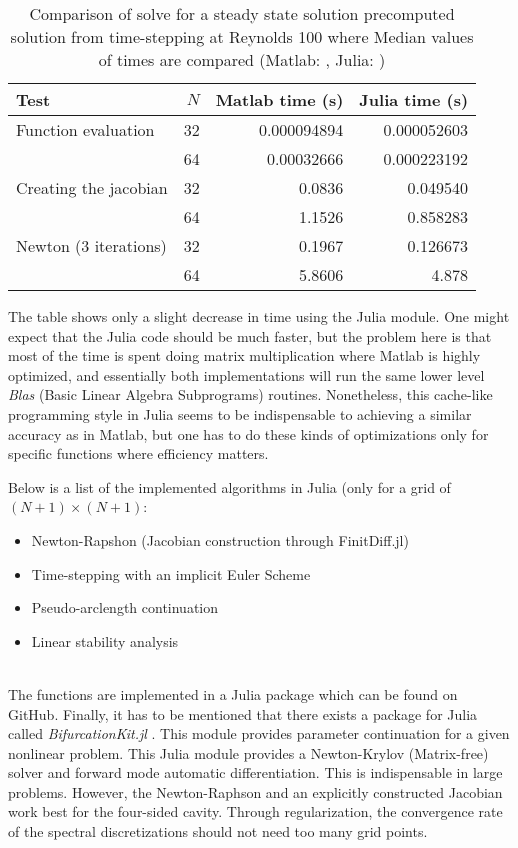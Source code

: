 \begin{table}[h!]
  \caption{Comparison of solve for a steady state solution precomputed solution 
    from time-stepping at Reynolds 100 where Median values of times are compared
  (Matlab: , Julia: )}
  \label{tab:matlab_julia}
\begin{tabular}{lrrr}
Test & $N$ & Matlab time (s) & Julia time (s) \\
\hline
Function evaluation  & 32 & 0.000094894  & 0.000052603 \\
& 64 & 0.00032666 & 0.000223192 \\
 Creating the jacobian  & 32 & 0.0836  &  0.049540  \\
& 64 & 1.1526 & 0.858283 \\
Newton (3 iterations)  & 32 & 0.1967  & 0.126673 \\
& 64 & 5.8606  & 4.878 \\
\end{tabular}
\end{table}

The table shows only a slight decrease in time using the Julia module. One
might expect that the Julia code should be much faster, but the problem here is
that most of the time is spent doing matrix multiplication where Matlab is
highly optimized, and essentially both implementations will run the same lower
level \emph{Blas} (Basic Linear Algebra Subprograms) routines. Nonetheless,
this cache-like programming style in Julia seems to be indispensable to
achieving a similar accuracy as in Matlab, but one has to do these kinds of
optimizations only for specific functions where efficiency matters.

Below is a list of the implemented algorithms in Julia (only for a grid of
$(N+1) \times (N+1)$:

\begin{itemize}
\item Newton-Rapshon (Jacobian construction through FinitDiff.jl)
\item Time-stepping with an implicit Euler Scheme
\item Pseudo-arclength continuation
\item Linear stability analysis
\end{itemize}

\\

The functions are implemented in a Julia package which can be found on GitHub.
Finally, it has to be mentioned that there exists a package for Julia called
\emph{BifurcationKit.jl} \citep{veltz2020}. This module provides parameter
continuation for a given nonlinear problem. This Julia module provides a
Newton-Krylov (Matrix-free) solver and forward mode automatic differentiation.
This is indispensable in large problems. However, the Newton-Raphson and an
explicitly constructed Jacobian work best for the four-sided cavity. Through
regularization, the convergence rate of the spectral discretizations should not
need too many grid points.
